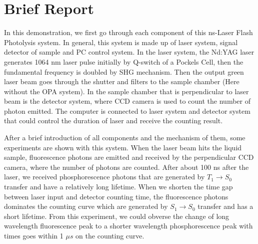 \documentclass{article}
\begin{document}
\section{Brief Report}
In this demonstration, we first go through each component of this ns-Laser Flash Photolysis system. In general, this system is made up of laser system, signal detector of sample and PC control system. In the laser system, the Nd:YAG laser generates 1064 nm laser pulse initially by Q-switch of a Pockels Cell, then the fundamental frequency is doubled by SHG mechanism. Then the output green laser beam goes through the shutter and filters to the sample chamber (Here without the OPA system). In the sample chamber that is perpendicular to laser beam is the detector system, where CCD camera is used to count the number of photon emitted. The computer is connected to laser system and detector system that could control the duration of laser and receive the counting result. \par 
After a brief introduction of all components and the mechanism of them, some experiments are shown with this system. When the laser beam hits the liquid sample, fluorescence photons are emitted and received by the perpendicular CCD camera, where the number of photons are counted. After about 100 ns after the laser, we received phosphorescence photons that are generated by $T_1 \rightarrow S_0$ transfer and have a relatively long lifetime. When we shorten the time gap between laser input and detector counting time, the fluorescence photons dominates the counting curve which are generated by $S_1 \rightarrow S_0$ transfer and has a short lifetime. From this experiment, we could obverse the change of long wavelength fluorescence peak to a shorter wavelength phosphorescence peak with times goes within 1 $\mu s$ on the counting curve.
\end{document}
